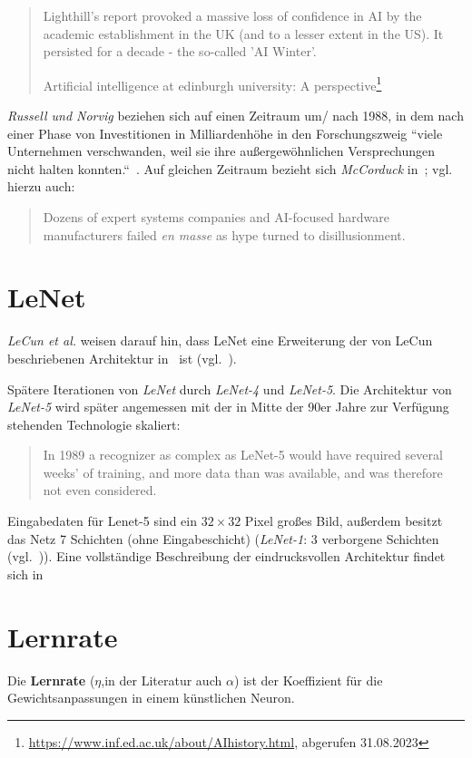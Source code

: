 \blockquote[Artificial intelligence at edinburgh university: A perspective\footnote{\url{https://www.inf.ed.ac.uk/about/AIhistory.html}, abgerufen 31.08.2023}]{
    Lighthill's report provoked a massive loss of confidence in AI by the academic establishment in the UK (and to a lesser extent in the US). It persisted for a decade - the so-called 'AI Winter'.
}

\noindent
\textit{Russell und Norvig} beziehen sich auf einen Zeitraum um/ nach 1988, in dem nach einer Phase von Investitionen in Milliardenhöhe in den Forschungszweig ``viele Unternehmen verschwanden, weil sie ihre außergewöhnlichen Versprechungen nicht halten konnten.``~\cite[48]{RN09}. Auf gleichen Zeitraum bezieht sich \textit{McCorduck} in~\cite[432]{Mcc04}; vgl. hierzu auch:

\blockquote[{\cite[656; Hervorhebung i.O.]{Gar19}}]{
    Dozens of expert systems companies and AI-focused hardware manufacturers failed \textit{en masse} as hype turned to disillusionment.
}



\section{LeNet}\label{appendix:lenet1}

\textit{LeCun et al.} weisen darauf hin, dass LeNet eine Erweiterung der von LeCun beschriebenen Architektur in~\cite{Cun89} ist (vgl.~\cite[544]{CBD+89}).

Spätere Iterationen von \textit{LeNet} durch \textit{LeNet-4} und \textit{LeNet-5}. Die Architektur von \textit{LeNet-5} wird später angemessen mit der in Mitte der 90er Jahre zur Verfügung stehenden Technologie skaliert:

\blockquote[{\cite[15]{CBBH98}}]{
    In 1989 a recognizer as complex as LeNet-5 would have required several weeks' of training, and more data than was available, and was therefore not even considered.
}
\noindent
Eingabedaten für Lenet-5 sind ein $32 \times 32$ Pixel großes Bild, außerdem besitzt das Netz 7 Schichten (ohne Eingabeschicht) (\textit{LeNet-1}: 3 verborgene Schichten (vgl.~\cite[544]{CBD+89})).
Eine vollständige Beschreibung der eindrucksvollen Architektur findet sich in~\cite[7 f.]{CBBH98}

\section{Lernrate}
Die \textbf{Lernrate} ($\eta$,in der Literatur auch $\alpha$) ist der Koeffizient für die Gewichtsanpassungen in einem künstlichen Neuron.

